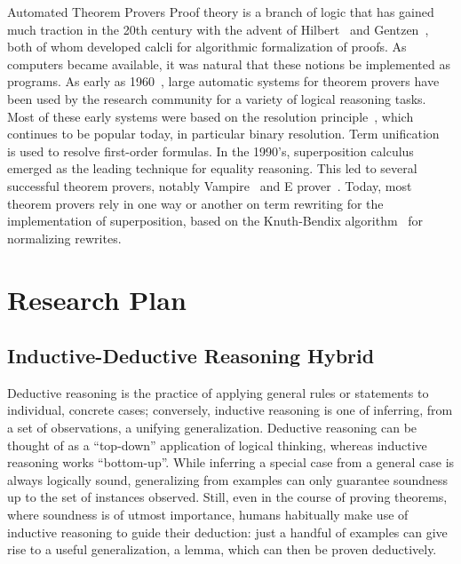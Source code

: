 \begin{paragraph}{Automated Theorem Provers}
Proof theory is a branch of logic that has gained much traction in the 20th century with the advent of Hilbert~\cite{Book1928:Hilbert} and Gentzen~\cite{j1935:Gentzen},
both of whom developed calcli for algorithmic formalization of proofs.
As computers became available, it was natural that these notions be implemented as programs.
As early as 1960~\cite{otter}, large automatic systems for theorem provers have been used by the research community for a variety of logical reasoning tasks.
Most of these early systems were based on the resolution principle~\cite{robinson1965}, which continues to be popular today, in particular binary resolution.
Term unification~\cite{robinson1965} is used to resolve first-order formulas.
In the 1990's, superposition calculus~\cite{LPAR1992:Bachmair} emerged as the leading technique for equality reasoning.
This led to several successful theorem provers, notably Vampire~\cite{JAR1995:Voronkov} and E prover~\cite{AIC2002:Schulz}.
Today, most theorem provers rely in one way or another on term rewriting for the implementation of superposition, based on the Knuth-Bendix algorithm~\cite{knuth-bendix} for normalizing rewrites.
\end{paragraph}


\section{Research Plan}

\subsection{Inductive-Deductive Reasoning Hybrid}

Deductive reasoning is the practice of applying general rules or statements to
individual, concrete cases; conversely, inductive reasoning is one of inferring,
from a set of observations, a unifying generalization.
Deductive reasoning can be thought of as a ``top-down'' application of logical
thinking, whereas inductive reasoning works ``bottom-up''.
While inferring a special case from a general case is always logically sound,
generalizing from examples can only guarantee soundness up to the set of
instances observed.
Still, even in the course of proving theorems, where soundness is of utmost
importance, humans habitually make use of inductive reasoning to guide their
deduction:
just a handful of examples can give rise to a useful generalization, a lemma,
which can then be proven deductively.

